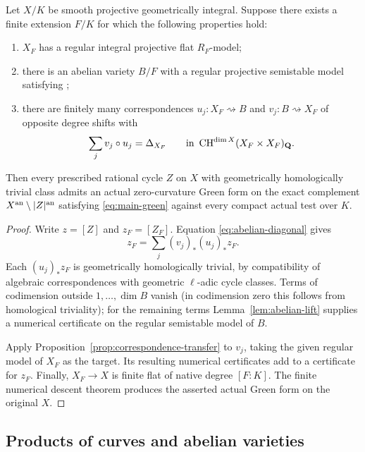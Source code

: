 \begin{theorem}
\label{thm:chow-abelian-criterion}
Let $X/K$ be smooth projective geometrically integral.  Suppose
there exists a finite extension $F/K$ for which the following
properties hold:
\begin{enumerate}
\item $X_F$ has a regular integral projective flat $R_F$-model;
\item there is an abelian variety $B/F$ with a regular projective
  semistable model satisfying ;
\item there are finitely many correspondences
  $u_j:X_F\rightsquigarrow B$ and
  $v_j:B\rightsquigarrow X_F$ of opposite degree shifts
  with
  \begin{equation}\label{eq:abelian-diagonal}
                \sum_jv_j\circ u_j=\Delta_{X_F}
       \qquad\text{in }\operatorname{CH}^{\dim X}(X_F\times X_F)_{\mathbf Q}.
  \end{equation}
\end{enumerate}
Then every prescribed rational cycle $Z$ on $X$ with
geometrically homologically trivial class admits an actual
zero-curvature Green form on the exact complement
$X^{\mathrm{an}}\setminus |Z|^{\mathrm{an}}$ satisfying
\eqref{eq:main-green} against every compact actual test over $K$.
\end{theorem}

\begin{proof}
Write $z=[Z]$ and $z_F=[Z_F]$.  Equation
\eqref{eq:abelian-diagonal} gives
\[
             z_F=\sum_j(v_j)_*(u_j)_*z_F.
\]
Each $(u_j)_*z_F$ is geometrically homologically trivial, by
compatibility of algebraic correspondences with geometric
$\ell$-adic cycle classes.  Terms of codimension outside
$1,\ldots,\dim B$ vanish (in codimension zero this follows
from homological triviality); for the remaining terms
Lemma~\ref{lem:abelian-lift} supplies a numerical certificate on
the regular semistable model of $B$.

Apply Proposition~\ref{prop:correspondence-transfer} to $v_j$, taking the
given regular model of $X_F$ as the target.  Its resulting
numerical certificates add to a certificate for $z_F$.
Finally, $X_F\to X$ is finite flat of native degree $[F:K]$.
The finite numerical descent theorem 
produces the asserted actual Green form on the original $X$.
\end{proof}

\subsection{Products of curves and abelian varieties}

